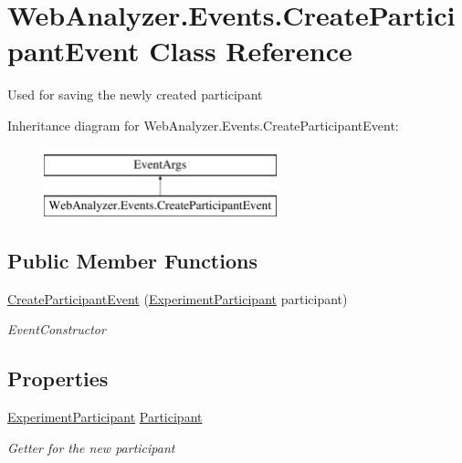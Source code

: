 \hypertarget{class_web_analyzer_1_1_events_1_1_create_participant_event}{}\section{Web\+Analyzer.\+Events.\+Create\+Participant\+Event Class Reference}
\label{class_web_analyzer_1_1_events_1_1_create_participant_event}


Used for saving the newly created participant  


Inheritance diagram for Web\+Analyzer.\+Events.\+Create\+Participant\+Event\+:\begin{figure}[H]
\begin{center}
\leavevmode
\includegraphics[height=2.000000cm]{class_web_analyzer_1_1_events_1_1_create_participant_event}
\end{center}
\end{figure}
\subsection*{Public Member Functions}
\begin{DoxyCompactItemize}
\item 
\hyperlink{class_web_analyzer_1_1_events_1_1_create_participant_event_a1e477fe5448547a7b6c44baf9cceb16d}{Create\+Participant\+Event} (\hyperlink{class_web_analyzer_1_1_models_1_1_base_1_1_experiment_participant}{Experiment\+Participant} participant)
\begin{DoxyCompactList}\small\item\em Event\+Constructor \end{DoxyCompactList}\end{DoxyCompactItemize}
\subsection*{Properties}
\begin{DoxyCompactItemize}
\item 
\hyperlink{class_web_analyzer_1_1_models_1_1_base_1_1_experiment_participant}{Experiment\+Participant} \hyperlink{class_web_analyzer_1_1_events_1_1_create_participant_event_a33ceb02517db8c73eac1753aedc7823c}{Participant}
\begin{DoxyCompactList}\small\item\em Getter for the new participant \end{DoxyCompactList}\end{DoxyCompactItemize}
